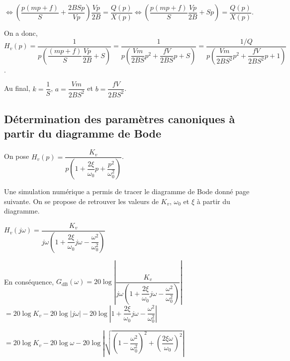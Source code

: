 \begin{multicols}{2}
\begin{corrige}
$\Longleftrightarrow
\left(\dfrac{p\left(mp+f\right)}{S} +\dfrac{2BSp}{Vp}\right) \dfrac{Vp}{2B}=
\dfrac{Q(p)}{ X(p)}
\Longleftrightarrow
\left(\dfrac{p\left(mp+f\right)}{S} \dfrac{Vp}{2B}+Sp \right) =
\dfrac{Q(p)}{ X(p)}$.


On a donc, 
$H_v(p)
=\dfrac{1}{p\left(\dfrac{\left(mp+f\right)}{S} \dfrac{Vp}{2B}+S \right)}
=\dfrac{1}{p\left(\dfrac{Vm}{2BS}p^2+ \dfrac{fV}{2BS}p+S \right)}
=\dfrac{1/Q}{p\left(\dfrac{Vm}{2BS^2}p^2+ \dfrac{fV}{2BS^2}p+1 \right)}
$.

Au final, $k=\dfrac{1}{S}$, $a=\dfrac{Vm}{2BS^2}$ et $b=\dfrac{fV}{2BS^2}$.
\end{corrige} \else \fi

\subsection*{Détermination des paramètres canoniques à partir du diagramme de Bode}
\ifprof
\else
On pose $H_v(p)=\dfrac{K_v}{p\left( 1+\dfrac{2\xi}{\omega_0} p + \dfrac{p^2}{\omega_0^2} \right)}$. 

Une simulation numérique a permis de tracer le diagramme de Bode donné page suivante. On se propose de retrouver les valeurs de $K_v$, $\omega_0$ et $\xi$ à partir du diagramme.

\fi


\ifprof \begin{corrige}
$H_v(j\omega )=\dfrac{K_v}{j\omega\left( 1+\dfrac{2\xi}{\omega_0} j\omega - \dfrac{\omega^2}{\omega_0^2} \right)}$

En conséquence,  $
G_{\text{dB}}\left(\omega \right)=20\log\left| \dfrac{K_v}{j\omega\left( 1+\dfrac{2\xi}{\omega_0} j\omega - \dfrac{\omega^2}{\omega_0^2} \right)} \right|
$
$
=20\log K_v- 20\log  \left| j\omega\right| - 20\log  \left| 1+\dfrac{2\xi}{\omega_0} j\omega - \dfrac{\omega^2}{\omega_0^2}  \right|
$

$
=20\log K_v- 20\log  \omega - 20\log  \left| \sqrt{\left(1- \dfrac{\omega^2}{\omega_0^2} \right)^2+\left( \dfrac{2\xi\omega }{\omega_0} \right)^2} \right|
$


\end{corrige}
\end{multicols}

